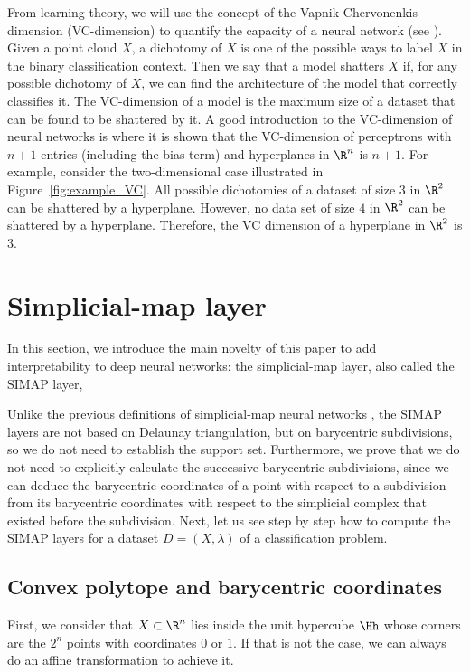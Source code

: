  From learning theory, we will use the concept of the Vapnik-Chervonenkis dimension (VC-dimension) to quantify the capacity of a neural network (see \cite{vapnik:264}).
 Given a point cloud $X$,  a dichotomy of  $X$ is one of the possible ways to label $X$  in the binary classification context. Then we say that a model shatters $X$  if, 
 for any possible dichotomy of $X$,  we can find the architecture of the model that correctly classifies it.
 The VC-dimension of a model is the maximum size of a dataset that can be found to be shattered by it.
 A good introduction to the VC-dimension of neural networks is \cite{sontang} where it is shown that
the  VC-dimension of perceptrons with $n+1$ entries (including the bias term)  and hyperplanes in $\R^n$ is $n+1$. For example, consider the two-dimensional case illustrated 
 in Figure~\ref{fig:example_VC}.
 All possible dichotomies of a dataset of size $3$ in $\R^2$ can be shattered by a hyperplane. However, no data set of size $4$ in $\R^2$ 
 can be shattered by a hyperplane. Therefore, the VC dimension of a hyperplane in $\R^2$ is $3$.



\section{Simplicial-map layer}\label{subsec:tetra}

In this section, we introduce the main novelty of this paper to add interpretability to deep neural networks: the simplicial-map layer, also called the SIMAP layer, 

Unlike the previous definitions of simplicial-map neural networks \cite{paluzohidalgo2023explainability}, the SIMAP layers are not based on Delaunay triangulation, but on barycentric subdivisions, so we do not need to establish the support set.
Furthermore, we prove that we do not need to explicitly calculate the successive barycentric subdivisions, since we can deduce the barycentric coordinates of a point with respect to a subdivision from its barycentric coordinates with respect to the simplicial complex that existed
before the subdivision.
Next, let us see step by step how to compute the SIMAP layers for a dataset $D=(X,\lambda)$ of a classification problem.

\subsection{Convex polytope and barycentric coordinates}
\label{subsec:poly}
First, we consider that $X\subset \R^n$ lies inside the unit hypercube $\Hh$ whose corners are the $2^n$  points with coordinates $0$ or $1$. 
If that is not the case, we can always do an affine transformation to achieve it.

